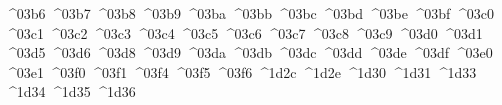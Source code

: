 {  ^^^^03b6%
  ^^^^03b7%
  ^^^^03b8%
  ^^^^03b9%
  ^^^^03ba%
  ^^^^03bb%
  ^^^^03bc%
  ^^^^03bd%
  ^^^^03be%
  ^^^^03bf%
  ^^^^03c0%
  ^^^^03c1%
  ^^^^03c2%
  ^^^^03c3%
  ^^^^03c4%
  ^^^^03c5%
  ^^^^03c6%
  ^^^^03c7%
  ^^^^03c8%
  ^^^^03c9%
  ^^^^03d0%
  ^^^^03d1%
  ^^^^03d5%
  ^^^^03d6%
  ^^^^03d8%
  ^^^^03d9%
  ^^^^03da%
  ^^^^03db%
  ^^^^03dc%
  ^^^^03dd%
  ^^^^03de%
  ^^^^03df%
  ^^^^03e0%
  ^^^^03e1%
  ^^^^03f0%
  ^^^^03f1%
  ^^^^03f4%
  ^^^^03f5%
  ^^^^03f6%
  ^^^^1d2c%
  ^^^^1d2e%
  ^^^^1d30%
  ^^^^1d31%
  ^^^^1d33%
  ^^^^1d34%
  ^^^^1d35%
  ^^^^1d36%
}
